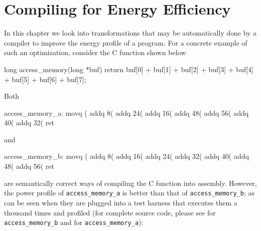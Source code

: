 \chapter{Compiling for Energy Efficiency}

\label{Chapter3}


In this chapter we look into transformations that may be automatically
done by a compiler to improve the energy profile of a program.  For a
concrete example of such an optimization, consider the C function
shown below

\begin{ccode}
long access_memory(long *buf) {
  return buf[0] + buf[1] + buf[2] + buf[3] +
         buf[4] + buf[5] + buf[6] + buf[7];
}
\end{ccode}

Both

\begin{ccode}
access_memory_a:
  movq    (%
  addq    8(%
  addq    24(%
  addq    16(%
  addq    48(%
  addq    56(%
  addq    40(%
  addq    32(%
  ret
\end{ccode}

and

\begin{gascode}
access_memory_b:
  movq    (%
  addq    8(%
  addq    16(%
  addq    24(%
  addq    32(%
  addq    40(%
  addq    48(%
  addq    56(%
  ret
\end{gascode}

are semantically correct ways of compiling the C function into
assembly.  However, the power profile of \texttt{access\_memory\_a} is
better than that of \texttt{access\_memory\_b}; as can be seen when
they are plugged into a test harness that executes them a thousand
times and profiled (for complete source code, please see
 for \texttt{access\_memory\_b} and
 for \texttt{access\_memory\_a}):


